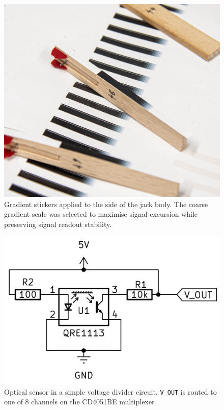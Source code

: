 \begin{figure}[b]  
  \centering
  \includegraphics[width=\linewidth]{src/images/tagging-jacks-3.jpg} 
  \caption{Gradient stickers applied to the side of the jack body. The coarse gradient scale was selected to maximise signal excursion while preserving signal readout stability.}
  \Description{} 
  \label{fig:jack-tags}
\end{figure}

\begin{figure}[b]  
  \centering
  \includegraphics[width=\linewidth]{src/images/simple-schematic-bw-.jpg} 
  \caption{Optical sensor in a simple voltage divider circuit. \texttt{V\_OUT} is routed to one of 8 channels on the CD4051BE multiplexer}
  \Description{} 
  \label{fig:simple-schematic}
\end{figure}



